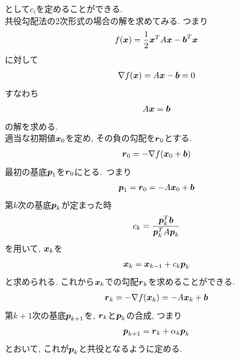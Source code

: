 \documentclass[dvipdfmx,a4j]{jsarticle}
\begin{document}
として$c_{i}$を定めることができる.\\[0.5cm]
共役勾配法の2次形式の場合の解を求めてみる. つまり
\begin{eqnarray*}
    f(\mbox{\boldmath $x$})=\frac{1}{2}\mbox{\boldmath $x$}^{T}A\mbox{\boldmath $x$}-\mbox{\boldmath $b$}^{T}\mbox{\boldmath $x$}
\end{eqnarray*}
に対して
\begin{eqnarray*}
    \nabla f(\mbox{\boldmath $x$})=A\mbox{\boldmath $x$}-\mbox{\boldmath $b$}=0
\end{eqnarray*}
すなわち
\begin{eqnarray*}
    A\mbox{\boldmath $x$}=\mbox{\boldmath $b$}
\end{eqnarray*}
の解を求める.\\
適当な初期値$\mbox{\boldmath $x$}_{0}$を定め, その負の勾配を$\mbox{\boldmath $r$}_{0}$とする.
\begin{eqnarray*}
    \mbox{\boldmath $r$}_{0}=-\nabla f(\mbox{\boldmath $x$}_{0}+\mbox{\boldmath $b$})
\end{eqnarray*}
最初の基底$\mbox{\boldmath $p$}_{1}$を$\mbox{\boldmath $r$}_{0}$にとる.\ つまり
\begin{eqnarray*}
    \mbox{\boldmath $p$}_{1}=\mbox{\boldmath $r$}_{0}=-A\mbox{\boldmath $x$}_{0}+\mbox{\boldmath $b$}
\end{eqnarray*}
第$k$次の基底$\mbox{\boldmath $p$}_{k}$が定まった時
\begin{eqnarray*}
    c_{k}=\frac{\mbox{\boldmath $p$}_{k}^{T}\mbox{\boldmath $b$}}{\mbox{\boldmath $p$}_{k}^{T}A\mbox{\boldmath $p$}_{k}}
\end{eqnarray*}
を用いて, $\mbox{\boldmath $x$}_{k}$を
\begin{eqnarray*}
    \mbox{\boldmath $x$}_{k}=\mbox{\boldmath $x$}_{k-1}+c_{k}\mbox{\boldmath $p$}_{k}
\end{eqnarray*}
と求められる. これから$\mbox{\boldmath $x$}_{k}$での勾配$\mbox{\boldmath $r$}_{k}$を求めることができる.
\begin{eqnarray*}
    \mbox{\boldmath $r$}_{k}=-\nabla f(\mbox{\boldmath $x$}_{k})=-A\mbox{\boldmath $x$}_{k}+\mbox{\boldmath $b$}
\end{eqnarray*}
第$k+1$次の基底$\mbox{\boldmath $p$}_{k+1}$を, $\mbox{\boldmath $r$}_{k}$と$\mbox{\boldmath $p$}_{k}$の合成, つまり
\begin{eqnarray*}
    \mbox{\boldmath $p$}_{k+1}=\mbox{\boldmath $r$}_{k}+\alpha_{k}\mbox{\boldmath $p$}_{k}
\end{eqnarray*}
とおいて, これが$\mbox{\boldmath $p$}_{k}$と共役となるように定める.\\
\end{document}
